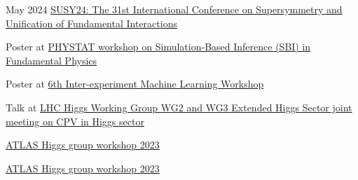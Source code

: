 
\begin{cventries}
    {}
    {May 2024}
    {\href{https://indico.cern.ch/event/1354279/contributions/5942297/}{SUSY24: The 31st International Conference on Supersymmetry and Unification of Fundamental Interactions}}
    {}\vspace*{2mm}

    {}
    {}
    {}
    {
        \begin{cvitems}
        \item Poster at \href{https://indico.cern.ch/event/1355601/contributions/5910202/}{PHYSTAT workshop on Simulation-Based Inference (SBI) in Fundamental Physics}
        \item Poster at \href{https://indico.cern.ch/event/1297159/contributions/5729232/}{6th Inter-experiment Machine Learning Workshop}
        \item Talk at \href{https://indico.cern.ch/event/1230456/\#5-simulation-based-inference-i}{LHC Higgs Working Group WG2 and WG3 Extended Higgs Sector joint meeting on CPV in Higgs sector}
        \end{cvitems}
    }\vspace*{2mm}


    {}
    {}
    {\href{https://indico.cern.ch/event/1280531/contributions/5556190/}{ATLAS Higgs group workshop 2023}}{}\vspace*{2mm}

    {}
    {}
    {\href{https://indico.cern.ch/event/1280531/contributions/5559532/}{ATLAS Higgs group workshop 2023}}{}\vspace*{2mm}


\end{cventries}
